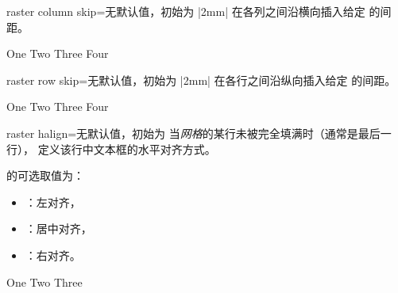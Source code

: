 \enlargethispage*{1cm}

\begin{docTcbKey}[][doc new=2014-11-10]{raster column skip}{=}{无默认值，初始为 |2mm|}
 在各列之间沿横向插入给定  的间距。
\begin{dispExample}
\begin{tcbitemize}[raster column skip=2cm,
  size=small,colframe=red!50!black,colback=red!10!white]
  \tcbitem One
  \tcbitem Two
  \tcbitem Three
  \tcbitem Four
\end{tcbitemize}
\end{dispExample}
\end{docTcbKey}

\begin{docTcbKey}[][doc new=2014-11-10]{raster row skip}{=}{无默认值，初始为 |2mm|}
 在各行之间沿纵向插入给定  的间距。
\begin{dispExample}
\begin{tcbitemize}[raster row skip=0pt,
  size=small,colframe=red!50!black,colback=red!10!white]
  \tcbitem One
  \tcbitem Two
  \tcbitem Three
  \tcbitem Four
\end{tcbitemize}
\end{dispExample}
\end{docTcbKey}

\clearpage

\begin{docTcbKey}[][doc new=2014-11-10]{raster halign}{=}{无默认值，初始为 }
  当\emph{网格}的某行未被完全填满时（通常是最后一行），
  定义该行中文本框的水平对齐方式。

   的可选取值为：
  \begin{itemize}
  \item{}：左对齐，
  \item{}：居中对齐，
  \item{}：右对齐。
  \end{itemize}

\begin{dispExample}
\begin{tcbitemize}[raster halign=center,
  size=small,colframe=red!50!black,colback=red!10!white]
  \tcbitem One
  \tcbitem Two
  \tcbitem Three
\end{tcbitemize}
\end{dispExample}
\end{docTcbKey}


